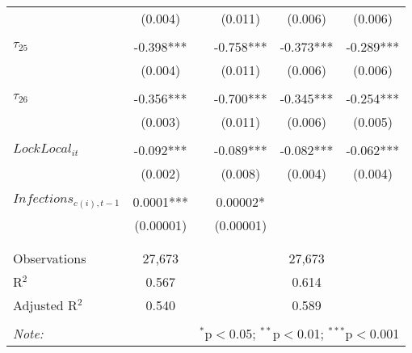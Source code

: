 \begin{tabular}{@{\extracolsep{-5pt}}lccccc}
                &  (0.004)  &&  (0.011)  &  (0.006)  &  (0.006)  \\
                &           &&           &           &           \\[-2.1ex]
$\tau_{25}$     & -0.398*** && -0.758*** & -0.373*** & -0.289*** \\
                &  (0.004)  &&  (0.011)  &  (0.006)  &  (0.006)  \\
                &           &&           &           &           \\[-2.1ex]
$\tau_{26}$     & -0.356*** && -0.700*** & -0.345*** & -0.254*** \\
                &  (0.003)  &&  (0.011)  &  (0.006)  &  (0.005)  \\
                &           &&           &           &           \\[-1.ex]
$LockLocal_{it}$ & -0.092*** && -0.089*** & -0.082*** & -0.062*** \\
                &  (0.002)  &&  (0.008)  &  (0.004)  &  (0.004)  \\
                &           &&           &           &           \\[-1.1ex]
$Infections _{c(i),t-1}$ & 0.0001*** &&  0.00002* &           &           \\
                         & (0.00001) && (0.00001) &           &           \\
                         &           &&           &           &           \\[-2.1ex]

\hline \\[-1.8ex] 
Observations     & 27,673 && \multicolumn{3}{c}{27,673} \\ 
R$^{2}$          &  0.567 && \multicolumn{3}{c}{0.614 } \\ 
Adjusted R$^{2}$ &  0.540 && \multicolumn{3}{c}{0.589 } \\ 
\hline 
\hline \\[-1.8ex] 
\textit{Note:}  & \multicolumn{5}{r}{$^{*}$p$<$0.05; $^{**}$p$<$0.01; $^{***}$p$<$0.001} \\ 
\end{tabular} 